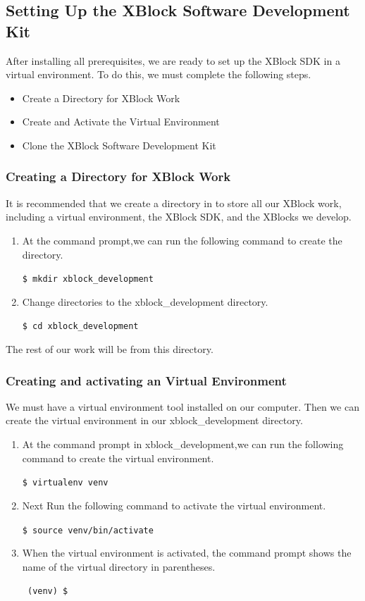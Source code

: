 \subsection{Setting Up the XBlock Software Development Kit}
After installing all prerequisites, we are ready to set up the XBlock SDK in a virtual environment.
To do this, we must complete the following steps.
\begin{itemize}
\item Create a Directory for XBlock Work
\item Create and Activate the Virtual Environment
\item Clone the XBlock Software Development Kit
\end{itemize}
\subsubsection{Creating a Directory for XBlock Work}
It is recommended that we create a directory in to store all our XBlock work, including a
virtual environment, the XBlock SDK, and the XBlocks we develop.
\begin{enumerate}
\item At the command prompt,we can run the following command to create the directory.
\begin{center}\verb=$ mkdir xblock_development=\end{center}
\item Change directories to the xblock\_development directory.
\begin{center}\verb=$ cd xblock_development=\end{center}
\end{enumerate}
The rest of our work will be from this directory.

\subsubsection{Creating and activating an Virtual Environment}
We must have a virtual environment tool installed on our computer. Then we can create the virtual
environment in our xblock\_development directory.
\begin{enumerate}
\item At the command prompt in xblock\_development,we can run the following command to
create the virtual environment.
\begin{center}\verb=$ virtualenv venv=\end{center}
\item Next Run the following command to activate the virtual environment.
\begin{center}\verb=$ source venv/bin/activate=\end{center}
\item When the virtual environment is activated, the command prompt shows the name of
the virtual directory in parentheses.
\begin{center}\verb= (venv) $=\end{center}
\end{enumerate}


